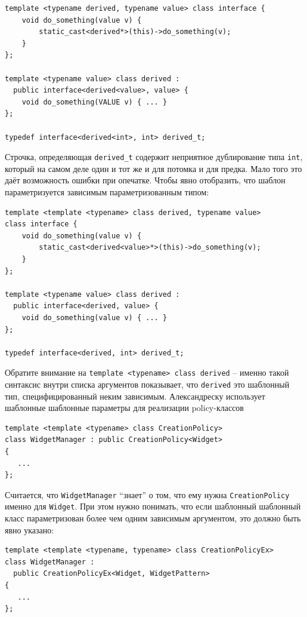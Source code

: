 \documentclass[a4paper,12pt,oneside]{article}
\begin{document}
\begin{lstlisting}
template <typename derived, typename value> class interface {
    void do_something(value v) {
        static_cast<derived*>(this)->do_something(v);
    }
};

template <typename value> class derived : 
  public interface<derived<value>, value> {
    void do_something(VALUE v) { ... }
};

typedef interface<derived<int>, int> derived_t;
\end{lstlisting}

Строчка, определяющая \lstinline!derived_t! содержит неприятное дублирование типа  \lstinline!int!, который на самом деле один и тот же и для потомка и для предка. Мало того это даёт возможность ошибки при опечатке. Чтобы явно отобразить, что шаблон параметризуется зависимым параметризованным типом:

\begin{lstlisting}
template <template <typename> class derived, typename value> 
class interface {
    void do_something(value v) {
        static_cast<derived<value>*>(this)->do_something(v);
    }
};

template <typename value> class derived : 
  public interface<derived, value> {
    void do_something(value v) { ... }
};

typedef interface<derived, int> derived_t;
\end{lstlisting}

Обратите внимание на \lstinline!template <typename> class derived! -- именно такой синтаксис внутри списка аргументов показывает, что \lstinline!derived! это шаблонный тип, специфицированный неким зависимым. Александреску\cite{mcpp} использует шаблонные шаблонные параметры для реализации policy-классов

\begin{lstlisting}
template <template <typename> class CreationPolicy>
class WidgetManager : public CreationPolicy<Widget>
{
   ...
};
\end{lstlisting}

Считается, что \lstinline!WidgetManager! ``знает'' о том, что ему нужна \lstinline!CreationPolicy! именно для \lstinline!Widget!. При этом нужно понимать, что если шаблонный шаблонный класс параметризован более чем одним зависимым аргументом, это должно быть явно указано:

\begin{lstlisting}
template <template <typename, typename> class CreationPolicyEx>
class WidgetManager : 
  public CreationPolicyEx<Widget, WidgetPattern>
{
   ...
};
\end{lstlisting}
\end{document}
